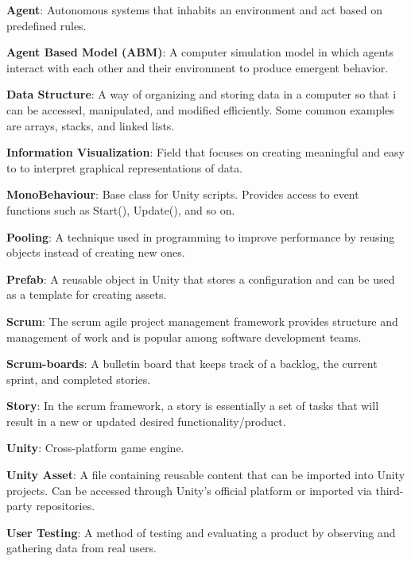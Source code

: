 
\noindent
\label{itm:agent}\textbf{Agent}: Autonomous systems that inhabits an environment and act based on predefined rules.

\noindent
\label{itm:abm}\textbf{Agent Based Model (ABM)}: A computer simulation model in which agents interact with each other and their environment to produce emergent behavior. 

\noindent
\label{itm:data-structure}\textbf{Data Structure}: A way of organizing and storing data in a computer so that i can be accessed, manipulated, and modified efficiently. Some common examples are arrays, stacks, and linked lists. 

\noindent
\label{itm:information-visualization}\textbf{Information Visualization}: Field that focuses on creating meaningful and easy to to interpret graphical representations of data.

\noindent
\label{itm:monobehaviour}\textbf{MonoBehaviour}: Base class for Unity scripts. Provides access to event functions such as Start(), Update(), and so on.

\noindent
\label{itm:pooling}\textbf{Pooling}: A technique used in programming to improve performance by reusing objects instead of creating new ones. 

\noindent
\label{itm:prefab}\textbf{Prefab}: A reusable object in Unity that stores a configuration and can be used as a template for creating assets.

\noindent
\label{itm:scrum}\textbf{Scrum}: The scrum agile project management framework provides structure and management of work and is popular among software development teams.

\noindent %
\label{itm:scrum-boards}\textbf{Scrum-boards}: A bulletin board that keeps track of a backlog, the current sprint, and completed stories.

\noindent
\label{itm:story}\textbf{Story}: In the scrum framework, a story is essentially a set of tasks that will result in a new or updated desired functionality/product.  

\noindent
\label{itm:unity}\textbf{Unity}: Cross-platform game engine.

\noindent
\label{itm:unity-asset}\textbf{Unity Asset}: A file  containing reusable content that can be imported into Unity projects. Can be accessed through Unity's official platform or imported via third-party repositories. 

\noindent
\label{itm:user-testing}\textbf{User Testing}: A method of testing and evaluating a product by observing and gathering data from real users. 

